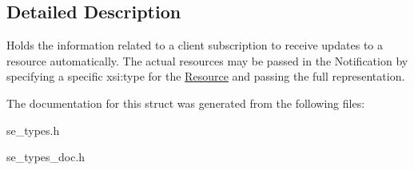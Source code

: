 \subsection{Detailed Description}
Holds the information related to a client subscription to receive updates to a resource automatically. The actual resources may be passed in the Notification by specifying a specific xsi\+:type for the \hyperlink{structResource}{Resource} and passing the full representation. 

The documentation for this struct was generated from the following files\+:\begin{DoxyCompactItemize}
\item 
se\+\_\+types.\+h\item 
se\+\_\+types\+\_\+doc.\+h\end{DoxyCompactItemize}
